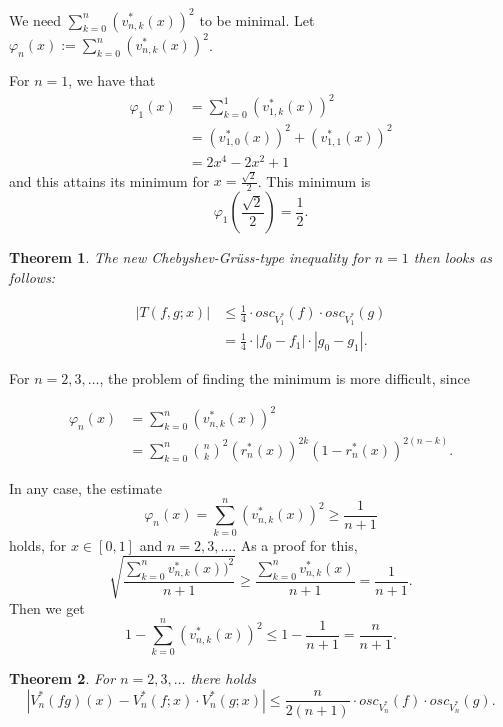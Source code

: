\documentclass[12pt,leqno,a4paper,dvips,twoside]{article}
\newtheorem{thm}{Theorem}[section]
\begin{document}
{We need $\sum^{n}_{k=0}{(v^*_{n,k}(x))^2}$ to be minimal. Let $\varphi_{n}(x):=\sum^{n}_{k=0}{(v^*_{n,k}(x))^2}$. 

For $n=1$, we have that 
	\begin{align*}	
	\varphi_{1}(x)&=\sum^{1}_{k=0}{(v^*_{1,k}(x))^2}\\
					&=(v^*_{1,0}(x))^2+(v^*_{1,1}(x))^2\\
					&=2x^4-2x^2+1
	\end{align*}
and this attains its minimum for $x=\frac{\sqrt{2}}{2}$. This minimum is 
	\begin{equation*}
		\varphi_{1}\left(\frac{\sqrt{2}}{2}\right)=\frac{1}{2}.
	\end{equation*}

\begin{thm}
The new Chebyshev-Gr\"{u}ss-type inequality for $n=1$ then looks as follows:

	\begin{align*}
		\left|T(f,g;x)\right|&\leq \frac{1}{4}\cdot osc_{V^*_1}(f)\cdot osc_{V^*_1}(g)\\
									  &=\frac{1}{4}\cdot \left|f_0-f_1\right|\cdot\left|g_0-g_1\right|.
	\end{align*}
\end{thm}
	
For $n=2,3,\ldots$, the problem of finding the minimum is more difficult, since

\begin{align*}
	\varphi_{n}(x)&=\sum^{n}_{k=0}{(v^*_{n,k}(x))^2}\\
	&=\sum^{n}_{k=0}{\binom{n}{k}^2(r^*_{n}(x))^{2k}(1-r^*_{n}(x))^{2(n-k)}}.
\end{align*}

In any case, the estimate 
	\begin{equation*}
		\varphi_{n}(x)=\sum^{n}_{k=0}{(v^*_{n,k}(x))^2}\geq \frac{1}{n+1}
	\end{equation*}
holds, for $x\in [0,1]$ and $n=2,3,\ldots$. As a proof for this,
	\begin{equation*}
		\sqrt{\frac{\sum^{n}_{k=0}{v^*_{n,k}(x))^2}}{n+1}}\geq \frac{\sum^{n}_{k=0}{v^*_{n,k}(x)}}{n+1}=\frac{1}{n+1}.
	\end{equation*}
Then we get
	\begin{equation*}
		1-\sum^{n}_{k=0}{(v^*_{n,k}(x))^2}\leq 1-\frac{1}{n+1}=\frac{n}{n+1}.
	\end{equation*}

\begin{thm}
For $n=2,3,\ldots$ there holds 
	\begin{equation*}
		\left|V^*_n(fg)(x)-V^*_n(f;x)\cdot V^*_n(g;x)\right|\leq \frac{n}{2(n+1)}\cdot osc_{V^*_n}(f)\cdot osc_{V^*_n}(g).
	\end{equation*}
\end{thm}

}
\end{document}
